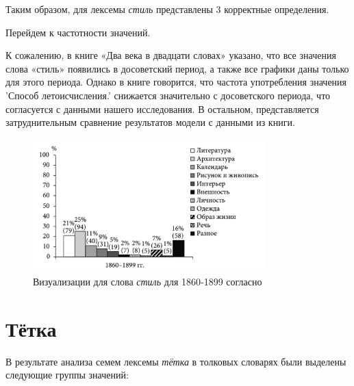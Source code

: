 Таким образом, для лексемы \textit{стиль} представлены 3 корректные определения.

Перейдем к частотности значений.

К сожалению, в книге «Два века в двадцати словах» указано,
что все значения слова «стиль» появились в досоветский период,
а также все графики даны только для этого периода.
Однако в книге говорится, что частота употребления значения ’Способ летоисчисления.’
снижается значительно с досоветского периода, что согласуется с данными нашего исследования.
В остальном, представляется затруднительным сравнение результатов модели с данными из книги.

\begin{figure}[H]
    \centering %
    \includegraphics[width=0.8\textwidth]{img/book/stil'/1860-1899}
    \caption{Визуализации для слова \textit{стиль} для 1860-1899 согласно~\cite{TwoCenturies}}
    \label{fig:Стиль}
\end{figure}

\section*{Тётка}

В результате анализа семем лексемы \textit{тётка} в толковых словарях были выделены следующие группы значений:

